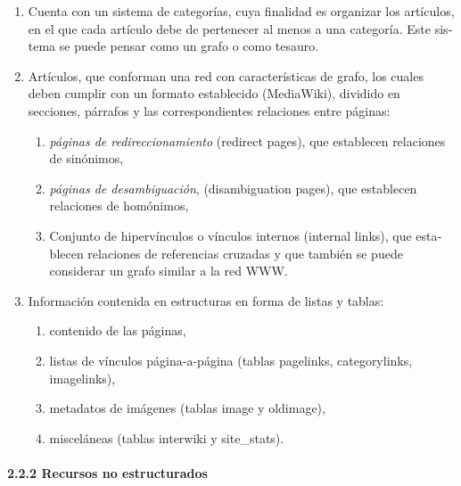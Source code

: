 \documentclass[letterpaper]{article}
\newcommand\textstylebibuscitbase[1]{#1}
\newcommand\liststyleWWviiiNumv{%
\renewcommand\theenumi{\arabic{enumi}}
\renewcommand\theenumii{\arabic{enumi}.\arabic{enumii}}
\renewcommand\theenumiii{\arabic{enumi}.\arabic{enumii}.\arabic{enumiii}}
\renewcommand\theenumiv{\arabic{enumi}.\arabic{enumii}.\arabic{enumiii}.\arabic{enumiv}}
\renewcommand\labelenumi{ \theenumi }
\renewcommand\labelenumii{ \theenumii }
\renewcommand\labelenumiii{ \theenumiii }
\renewcommand\labelenumiv{ \theenumiv }
}
\begin{document}
\liststyleWWviiiNumv
\begin{enumerate}
\item {\sffamily
\foreignlanguage{spanish}{Cuenta con un sistema de categor\'ias, cuya
finalidad es organizar los art\'iculos, en el que cada art\'iculo debe
de pertenecer al menos a una categor\'ia. Este sistema se} puede pensar
como un grafo o como tesauro\textstylebibuscitbase{.}}
\item {\sffamily
Art\'iculos, que conforman una red con caracter\'isticas de grafo, los
cuales deben cumplir con un formato establecido (MediaWiki), dividido
en secciones, p\'arrafos y las correspondientes relaciones entre
p\'aginas:}

\begin{enumerate}
\item {\sffamily
\textit{p\'aginas de redireccionamiento} (redirect pages), que
establecen relaciones de sin\'onimos,}
\item {\sffamily
\textit{p\'aginas de desambiguaci\'on}, (disambiguation pages), que
establecen relaciones de hom\'onimos,}
\item {\sffamily
Conjunto de hiperv\'inculos o v\'inculos
internos\foreignlanguage{spanish}{ (internal links), que establecen
relaciones de referencias cruzadas y }que tambi\'en se puede considerar
un grafo similar a la red WWW.}
\end{enumerate}
\item {\sffamily
Informaci\'on contenida en estructuras en forma de listas y tablas:}

\begin{enumerate}
\item {\sffamily
contenido de las p\'aginas,}
\item {\sffamily
listas de v\'inculos p\'agina-a-p\'agina (tablas pagelinks,
categorylinks, imagelinks),}
\item {\sffamily
metadatos de im\'agenes (tablas image y oldimage),}
\item {\sffamily
miscel\'aneas (tablas interwiki y site\_stats).}
\end{enumerate}
\end{enumerate}

\bigskip

\paragraph{2.2.2 Recursos no estructurados}
\end{document}
